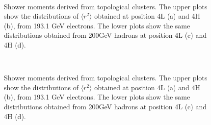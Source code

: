 \begin{figure}[!htb]
\begin{centering}
\\
\caption[Shower moments, $\langle r^2 \rangle$]{Shower moments derived from topological clusters. The upper plots show the distributions of $\langle r^2\rangle$ obtained at position 4L (a) and 4H (b), from 193.1 GeV electrons. The lower plots show the same distributions obtained from 200GeV hadrons at position 4L (c) and 4H (d).} 
\label{LC_moments_r2}
\end{centering}
\end{figure}
\begin{figure}[!htb]
\begin{centering}
\\
\caption[Shower moments, $\langle \lambda^2 \rangle$]{Shower moments derived from topological clusters. The upper plots show the distributions of $\langle r^2\rangle$ obtained at position 4L (a) and 4H (b), from 193.1 GeV electrons. The lower plots show the same distributions obtained from 200GeV hadrons at position 4L (c) and 4H (d).} 
\label{LC_moments_lambda2}
\end{centering}
\end{figure}

